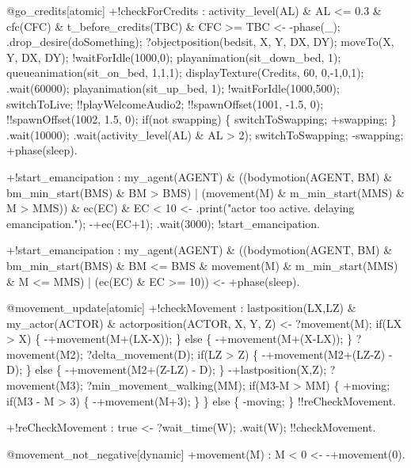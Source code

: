 \documentclass[draft,final]{vutinfth} %
\begin{document}
{@go\_credits[atomic]
+!checkForCredits : activity\_level(AL) \& AL <= 0.3 \& cfc(CFC) \& t\_before\_credits(TBC) \& CFC >= TBC
    <-  -phase(\_);
        .drop\_desire(doSomething);
        ?objectposition(bedsit, X, Y, DX, DY);
        moveTo(X, Y, DX, DY);
        !waitForIdle(1000,0);
        playanimation(sit\_down\_bed, 1);
        queueanimation(sit\_on\_bed, 1,1,1);
        displayTexture(Credits, 60, 0,-1,0,1);
        .wait(60000);
        playanimation(sit\_up\_bed, 1);
        !waitForIdle(1000,500);
        switchToLive;
        !!playWelcomeAudio2;
        !!spawnOffset(1001, -1.5, 0);
        !!spawnOffset(1002, 1.5, 0);
        if(not swapping)
        \{
            switchToSwapping;
            +swapping;
        \}
        .wait(10000);
        .wait(activity\_level(AL) \& AL > 2);
        switchToSwapping;
        -swapping;
        +phase(sleep).

+!start\_emancipation : my\_agent(AGENT) \& ((bodymotion(AGENT, BM) \& bm\_min\_start(BMS) \& BM > BMS) | (movement(M) \& m\_min\_start(MMS) \& M > MMS)) \& ec(EC) \& EC < 10
    <-  .print("actor too active. delaying emancipation.");
        -+ec(EC+1);
        .wait(3000);
        !start\_emancipation.

+!start\_emancipation : my\_agent(AGENT) \& ((bodymotion(AGENT, BM) \& bm\_min\_start(BMS) \& BM <= BMS \& movement(M) \& m\_min\_start(MMS) \& M <= MMS) | (ec(EC) \& EC >= 10))
    <-  +phase(sleep).

@movement\_update[atomic]
+!checkMovement : lastposition(LX,LZ) \& my\_actor(ACTOR) \& actorposition(ACTOR, X, Y, Z)
    <-  ?movement(M);
        if(LX > X)
        \{
            -+movement(M+(LX-X));
        \}
        else
        \{
            -+movement(M+(X-LX));
        \}
        ?movement(M2);
        ?delta\_movement(D);
        if(LZ > Z)
        \{
            -+movement(M2+(LZ-Z) - D);
        \}
        else
        \{
            -+movement(M2+(Z-LZ) - D);
        \}
        -+lastposition(X,Z);
        ?movement(M3);
        ?min\_movement\_walking(MM);
        if(M3-M > MM)
        \{
            +moving;
            if(M3 - M > 3)
            \{
                -+movement(M+3);
            \}
        \}
        else
        \{
            -moving;
        \}
        !!reCheckMovement.

+!reCheckMovement : true
    <-  ?wait\_time(W);
        .wait(W);
        !!checkMovement.

@movement\_not\_negative[dynamic]
+movement(M) : M < 0
    <-  -+movement(0).

}
\end{document}
